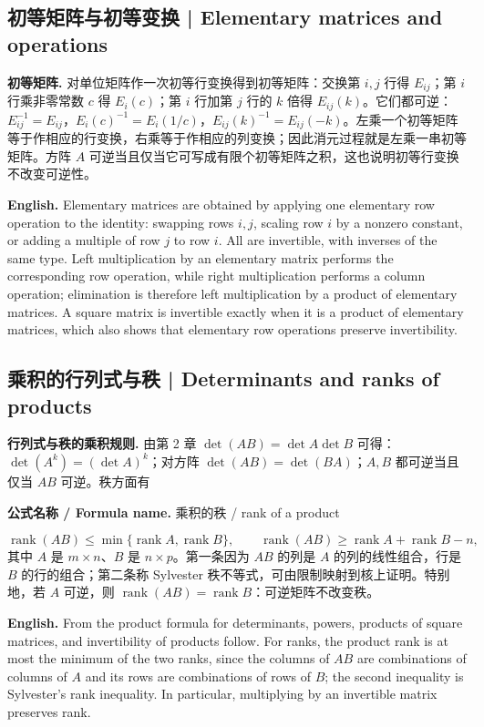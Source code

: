 \documentclass[UTF8,11pt,a4paper]{ctexart}
\newcommand{\EN}[1]{\par\noindent\textbf{English.} #1\par}
\newcommand{\FORMULA}[2]{\par\noindent\textbf{公式名称 / Formula name.} #1 / #2\par}
\begin{document}
\subsection{初等矩阵与初等变换 | Elementary matrices and operations}
\noindent\textbf{初等矩阵.} 对单位矩阵作一次初等行变换得到初等矩阵：交换第 $i,j$ 行得 $E_{ij}$；第 $i$ 行乘非零常数 $c$ 得 $E_i(c)$；第 $i$ 行加第 $j$ 行的 $k$ 倍得 $E_{ij}(k)$。它们都可逆：$E_{ij}^{-1}=E_{ij}$，$E_i(c)^{-1}=E_i(1/c)$，$E_{ij}(k)^{-1}=E_{ij}(-k)$。左乘一个初等矩阵等于作相应的行变换，右乘等于作相应的列变换；因此消元过程就是左乘一串初等矩阵。方阵 $A$ 可逆当且仅当它可写成有限个初等矩阵之积，这也说明初等行变换不改变可逆性。
\EN{Elementary matrices are obtained by applying one elementary row operation to the identity: swapping rows $i,j$, scaling row $i$ by a nonzero constant, or adding a multiple of row $j$ to row $i$. All are invertible, with inverses of the same type. Left multiplication by an elementary matrix performs the corresponding row operation, while right multiplication performs a column operation; elimination is therefore left multiplication by a product of elementary matrices. A square matrix is invertible exactly when it is a product of elementary matrices, which also shows that elementary row operations preserve invertibility.}

\subsection{乘积的行列式与秩 | Determinants and ranks of products}
\noindent\textbf{行列式与秩的乘积规则.} 由第 2 章 $\det(AB)=\det A\det B$ 可得：$\det(A^k)=(\det A)^k$；对方阵 $\det(AB)=\det(BA)$；$A,B$ 都可逆当且仅当 $AB$ 可逆。秩方面有
\FORMULA{乘积的秩}{rank of a product}
\[
\operatorname{rank}(AB)\le\min\{\operatorname{rank}A,\operatorname{rank}B\},\qquad
\operatorname{rank}(AB)\ge \operatorname{rank}A+\operatorname{rank}B-n,
\]
其中 $A$ 是 $m\times n$、$B$ 是 $n\times p$。第一条因为 $AB$ 的列是 $A$ 的列的线性组合，行是 $B$ 的行的组合；第二条称 Sylvester 秩不等式，可由限制映射到核上证明。特别地，若 $A$ 可逆，则 $\operatorname{rank}(AB)=\operatorname{rank}B$：可逆矩阵不改变秩。
\EN{From the product formula for determinants, powers, products of square matrices, and invertibility of products follow. For ranks, the product rank is at most the minimum of the two ranks, since the columns of $AB$ are combinations of columns of $A$ and its rows are combinations of rows of $B$; the second inequality is Sylvester's rank inequality. In particular, multiplying by an invertible matrix preserves rank.}
\end{document}
